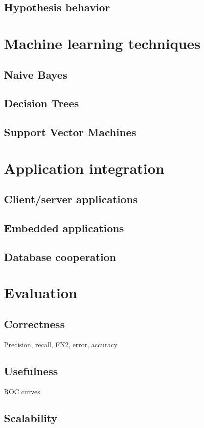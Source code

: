 \documentclass[a4paper]{report}
\begin{document}
\subsection{Hypothesis behavior}

\section{Machine learning techniques}
\subsection{Naive Bayes}
\subsection{Decision Trees}
\subsection{Support Vector Machines}

\section{Application integration}
\subsection{Client/server applications}
\subsection{Embedded applications}
\subsection{Database cooperation}

\section{Evaluation}
\subsection{Correctness}
Precision, recall, FN2, error, accuracy
\subsection{Usefulness}
ROC curves
\subsection{Scalability}
\end{document}
